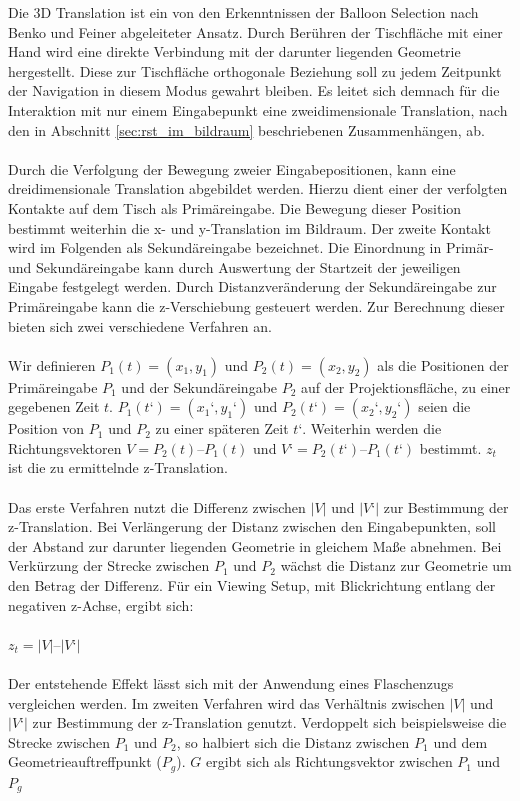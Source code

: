 Die 3D Translation ist ein von den Erkenntnissen der Balloon Selection nach Benko und Feiner \cite{benko:2007} abgeleiteter Ansatz. Durch Berühren  der Tischfläche mit einer Hand wird eine direkte Verbindung mit der darunter liegenden Geometrie hergestellt. Diese zur Tischfläche orthogonale Beziehung soll zu jedem Zeitpunkt der Navigation in diesem Modus gewahrt bleiben. Es leitet sich demnach für die Interaktion mit nur einem Eingabepunkt eine zweidimensionale Translation, nach den in Abschnitt \ref{sec:rst_im_bildraum} beschriebenen Zusammenhängen, ab.
\\\\
Durch die Verfolgung der Bewegung zweier Eingabepositionen, kann eine dreidimensionale Translation abgebildet werden. Hierzu dient einer der verfolgten Kontakte auf dem Tisch als Primäreingabe. Die Bewegung dieser Position bestimmt weiterhin die x- und y-Translation im Bildraum. Der zweite Kontakt wird im Folgenden als Sekundäreingabe bezeichnet. Die Einordnung in Primär- und Sekundäreingabe kann durch Auswertung der Startzeit der jeweiligen Eingabe festgelegt werden. Durch Distanzveränderung der Sekundäreingabe zur Primäreingabe kann die z-Verschiebung gesteuert werden. Zur Berechnung dieser bieten sich zwei verschiedene Verfahren an.
\\\\
Wir definieren $P_1(t) = (x_1, y_1)$ und $P_2(t) = (x_2, y_2)$ als die Positionen der Primäreingabe $P_1$ und der Sekundäreingabe $P_2$ auf der Projektionsfläche, zu einer gegebenen Zeit $t$. $P_1(t‘) = (x_1‘, y_1‘)$ und $P_2(t‘) = (x_2‘, y_2‘)$  seien die Position von $P_1$ und $P_2$ zu einer späteren Zeit $t‘$. Weiterhin werden die Richtungsvektoren $V = P_2(t) – P_1(t)$ und $V‘ = P_2(t‘) – P_1(t‘)$ bestimmt. $z_t$ ist die zu ermittelnde z-Translation.
\\\\
Das erste Verfahren nutzt die Differenz zwischen $|V|$ und $|V‘|$ zur Bestimmung der z-Translation. Bei Verlängerung der Distanz zwischen den Eingabepunkten, soll der Abstand zur darunter liegenden Geometrie in gleichem Maße abnehmen. Bei Verkürzung der Strecke zwischen $P_1$ und $P_2$ wächst die Distanz zur Geometrie um den Betrag der Differenz. Für ein Viewing Setup, mit Blickrichtung entlang der negativen z-Achse, ergibt sich:
\\\\
$z_t = |V| – |V‘|$
\\\\
Der entstehende Effekt lässt sich mit der Anwendung eines Flaschenzugs vergleichen werden. Im zweiten Verfahren wird das Verhältnis zwischen $|V|$ und $|V‘|$ zur Bestimmung der z-Translation genutzt. Verdoppelt sich beispielsweise die Strecke zwischen $P_1$ und $P_2$, so halbiert sich die Distanz zwischen $P_1$ und dem Geometrieauftreffpunkt ($P_g$). $G$ ergibt sich als Richtungsvektor zwischen $P_1$ und $P_g$
